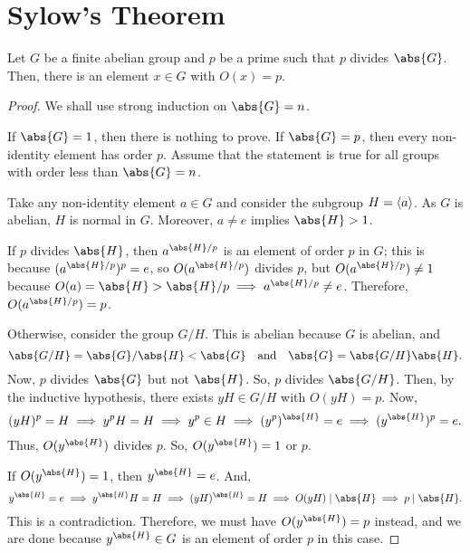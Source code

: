 \documentclass[11pt]{penrose}
\begin{document}
\section{Sylow's Theorem}
\begin{nthm}[Cauchy]
    Let $G$ be a finite abelian group and $p$ be a prime such that $p$ divides $\abs{G}$. Then, there is an element $x \in G$ with $O(x) = p$.
\end{nthm}
\begin{proof}
    We shall use strong induction on $\abs{G} = n$.

    If $\abs{G} = 1$, then there is nothing to prove. If $\abs{G} = p$, then every non-identity element has order $p$. Assume that the statement is true for all groups with order less than $\abs{G} = n$.

    Take any non-identity element $a \in G$ and consider the subgroup $H = \langle a\rangle$. As $G$ is abelian, $H$ is normal in $G$. Moreover, $a \neq e$ implies $\abs{H} > 1$.

    If $p$ divides $\abs{H}$, then $a^{\abs{H}/p}$ is an element of order $p$ in $G$; this is because $(a^{\abs{H}/p})^{p} = e$, so $O(a^{\abs{H}/p})$ divides $p$, but $O(a^{\abs{H}/p}) \neq 1$ because $O(a) = \abs{H} > \abs{H}/p \implies a^{\abs{H}/p} \neq e$. Therefore, $O(a^{\abs{H}/p}) = p$.

    Otherwise, consider the group $G/H$. This is abelian because $G$ is abelian, and
    \begin{equation*}
        \abs{G/H} = \abs{G} / \abs{H} < \abs{G}
        \quad\text{and}\quad
        \abs{G} = \abs{G/H} \abs{H}.
    \end{equation*}
    Now, $p$ divides $\abs{G}$ but not $\abs{H}$. So, $p$ divides $\abs{G/H}$. Then, by the inductive hypothesis, there exists $yH \in G/H$ with $O(yH) = p$. Now,
    \begin{equation*}
        (yH)^{p} = H
        \implies
        y^{p} H = H
        \implies
        y^{p} \in H
        \implies
        (y^{p})^{\abs{H}} = e
        \implies
        (y^{\abs{H}})^{p} = e.
    \end{equation*}
    Thus, $O(y^{\abs{H}})$ divides $p$. So, $O(y^{\abs{H}}) = 1$ or $p$.

    If $O(y^{\abs{H}}) = 1$, then $y^{\abs{H}} = e$. And,
    \begin{equation*}
        y^{\abs{H}} = e
        \implies
        y^{\abs{H}} H = H
        \implies
        (yH)^{\abs{H}} = H
        \implies
        O(yH) \mid \abs{H}
        \implies
        p \mid \abs{H}.
    \end{equation*}
    This is a contradiction. Therefore, we must have $O(y^{\abs{H}}) = p$ instead, and we are done because $y^{\abs{H}} \in G$ is an element of order $p$ in this case.
\end{proof}
\end{document}
